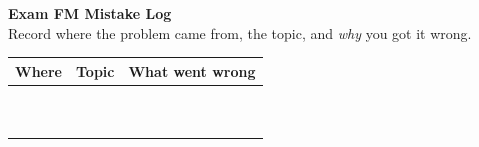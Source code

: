 \documentclass[11pt]{article}
\begin{document}
\begin{center}
{\LARGE \textbf{Exam FM Mistake Log}}\\
\vspace{0.3em}
{\small Record where the problem came from, the topic, and \emph{why} you got it wrong.}
\end{center}

\vspace{1em}

\renewcommand{\arraystretch}{1.4}

\begin{tabularx}{\textwidth}{
  >{\raggedright\arraybackslash}p{2.6cm}
  >{\raggedright\arraybackslash}p{3.2cm}
  X
}
\textbf{Where} & \textbf{Topic} & \textbf{What went wrong} \\
\hline
\\[-0.4em]   %

\underline{\hspace{2.4cm}} &
\underline{\hspace{3.0cm}} &
\underline{\hspace{9.3cm}}\\
\underline{\hspace{2.4cm}} & &
\underline{\hspace{9.3cm}}\\
\underline{\hspace{2.4cm}} & &
\underline{\hspace{9.3cm}}\\[0.5em]

\underline{\hspace{2.4cm}} &
\underline{\hspace{3.0cm}} &
\underline{\hspace{9.3cm}}\\
\underline{\hspace{2.4cm}} & &
\underline{\hspace{9.3cm}}\\
\underline{\hspace{2.4cm}} & &
\underline{\hspace{9.3cm}}\\[0.5em]

\underline{\hspace{2.4cm}} &
\underline{\hspace{3.0cm}} &
\underline{\hspace{9.3cm}}\\
\underline{\hspace{2.4cm}} & &
\underline{\hspace{9.3cm}}\\
\underline{\hspace{2.4cm}} & &
\underline{\hspace{9.3cm}}\\[0.5em]


\end{tabularx}
\end{document}
